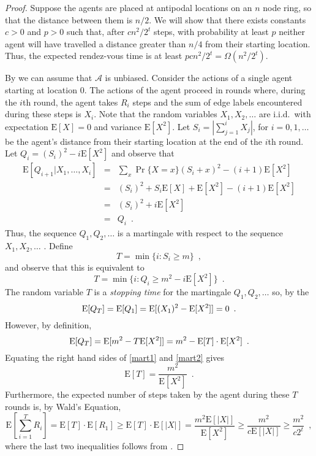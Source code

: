 \documentclass[lotsofwhite]{patmorin}
\newcommand{\E}{\mathrm{E}}
\newcommand{\A}{\mathcal{A}}
\begin{document}
\begin{proof}
Suppose the agents are placed at antipodal locations on an $n$ node ring,
so that the distance between them is $n/2$.  We will show that there
exists constants $c >0$ and $p> 0$ such that, after $cn^2/2^t$ steps,
with probability at least $p$ neither agent will have travelled a
distance greater than $n/4$ from their starting location.  Thus, the
expected rendez-vous time is at least $p cn^2/2^t = \Omega(n^2/2^t)$.

By  we can assume that $\A$ is unbiased.
Consider the actions of a single agent starting at location 0.  The
actions of the agent proceed in rounds where, during the $i$th round,
the agent takes $R_i$ steps and the sum of edge labels encountered
during these steps is $X_i$.  Note that the random variables
$X_1,X_2,\ldots$ are i.i.d.\ with expectation $\E[X]=0$ and variance
$\E[X^2]$.  Let $S_i=\left|\sum_{j=1}^i X_j\right|$, for
$i=0,1,\ldots$ be the agent's
distance from their starting location at the end of the $i$th round.
Let $Q_i= (S_i)^2 - i\E[X^2]$ and observe that 
\begin{eqnarray*}
 \E\left[Q_{i+1}|X_1,\ldots,X_i\right]
 & = & \sum_{x} \Pr\{X=x\}\left(S_i + x\right)^2 - (i+1)\E[X^2] \\
 & = & (S_i)^2 + S_i\E[X] + \E[X^2] - (i+1)\E[X^2] \\
 & = & (S_i)^2 + i\E[X^2] \\
 & = & Q_i  \enspace .
\end{eqnarray*}
Thus, the sequence $Q_1,Q_2,\ldots$ is a martingale with respect to
the sequence $X_1,X_2,\ldots$ \cite{ross}.  Define
\[
    T = \min\{i : S_i \ge m \} \enspace ,
\]
and observe that this is equivalent to 
\[
    T = \min\{i : Q_i \ge m^2 - i\E[X^2] \} \enspace .
\]
The random variable $T$ is a \emph{stopping time} for the martingale
$Q_1,Q_2,\ldots$ so, by the 
\begin{equation}
  \E[Q_T] 
    = \E[Q_1] 
    = \E[(X_1)^2 - \E[X^2]] = 0 \enspace . \eqlabel{mart1}
\end{equation}
However, by definition, 
\begin{equation}
  \E[Q_T] 
    = \E[m^2 - T\E[X^2]] 
    = m^2 - \E[T]\cdot\E[X^2] \enspace . \eqlabel{mart2}
\end{equation}
Equating the right hand sides of \eqref{mart1} and \eqref{mart2} gives 
\[
   \E[T] = \frac{m^2}{\E[X^2]} \enspace .
\]
Furthermore, the expected number of steps taken by the agent during
these $T$ rounds is, by Wald's Equation, 
\[
  \E\left[\sum_{i=1}^T R_i\right] 
    =  \E[T]\cdot\E[R_1] 
   \ge \E[T]\cdot\E[|X|] 
    =  \frac{m^2 \E[|X|]}{\E[X^2]} 
   \ge \frac{m^2}{c\E[|X|]} 
   \ge \frac{m^2}{c2^t} 
   \enspace ,
\] 
where the last two inequalities follows from .
\end{proof}
\end{document}
